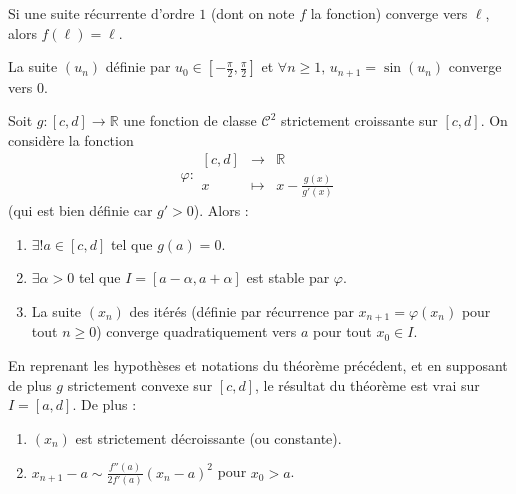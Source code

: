   \begin{corollary}
    Si une suite récurrente d'ordre $1$ (dont on note $f$ la fonction) converge vers $\ell$, alors $f(\ell) = \ell$.
  \end{corollary}

  \begin{example}
    La suite $(u_n)$ définie par $u_0 \in \left[ -\frac{\pi}{2}, \frac{\pi}{2} \right]$ et $\forall n \geq 1, \, u_{n+1} = \sin(u_n)$ converge vers $0$.
  \end{example}


  \begin{application}
    Soit $g : [c, d] \rightarrow \mathbb{R}$ une fonction de classe $\mathcal{C}^2$ strictement croissante sur $[c, d]$. On considère la fonction
    \[ \varphi :
    \begin{array}{ccc}
      [c, d] &\rightarrow& \mathbb{R} \\
      x &\mapsto& x - \frac{g(x)}{g'(x)}
    \end{array}
    \]
    (qui est bien définie car $g' > 0$). Alors :
    \begin{enumerate}[label={\bfseries(\roman*)}]
      \item $\exists! a \in [c, d]$ tel que $g(a) = 0$.
      \item $\exists \alpha > 0$ tel que $I = [a - \alpha, a + \alpha]$ est stable par $\varphi$.
      \item La suite $(x_n)$ des itérés (définie par récurrence par $x_{n+1} = \varphi(x_n)$ pour tout $n \geq 0$) converge quadratiquement vers $a$ pour tout $x_0 \in I$.
    \end{enumerate}
  \end{application}

  \begin{corollary}
    En reprenant les hypothèses et notations du théorème précédent, et en supposant de plus $g$ strictement convexe sur $[c, d]$, le résultat du théorème est vrai sur $I = [a, d]$. De plus :
    \begin{enumerate}[label={\bfseries(\roman*)}]
      \item $(x_n)$ est strictement décroissante (ou constante).
      \item $x_{n+1} - a \sim \frac{f''(a)}{2f'(a)} (x_n - a)^2$ pour $x_0 > a$.
    \end{enumerate}
  \end{corollary}

